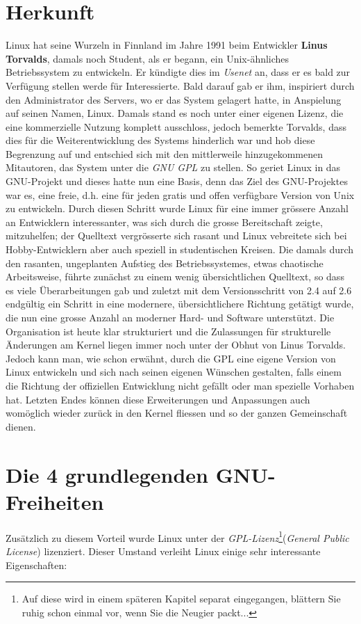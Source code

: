 \documentclass[b5paper,10pt,dvips,fleqn,titlepage,twoside]{book}
\begin{document}
\section{Herkunft}
Linux hat seine Wurzeln in Finnland im Jahre 1991 beim Entwickler \textbf{Linus Torvalds}, damals noch Student, als er begann, ein Unix-ähnliches Betriebssystem zu entwickeln. Er kündigte dies im \emph{Usenet} an, dass er es bald zur Verfügung stellen werde für Interessierte. Bald darauf gab er ihm, inspiriert durch den Administrator des Servers, wo er das System gelagert hatte, in Anspielung auf seinen Namen, Linux.
Damals stand es noch unter einer eigenen Lizenz, die eine kommerzielle Nutzung komplett ausschloss, jedoch bemerkte Torvalds, dass dies für die Weiterentwicklung des Systems hinderlich war und hob diese Begrenzung auf und entschied sich mit den mittlerweile hinzugekommenen Mitautoren, das System unter die \emph{GNU GPL} zu stellen. So geriet Linux in das GNU-Projekt und dieses hatte nun eine Basis, denn das Ziel des GNU-Projektes war es, eine freie, d.h. eine für jeden gratis und offen verfügbare Version von Unix zu entwickeln. Durch diesen Schritt wurde Linux für eine immer grössere Anzahl an Entwicklern interessanter, was sich durch die grosse Bereitschaft zeigte, mitzuhelfen; der Quelltext vergrösserte sich rasant und Linux vebreitete sich bei Hobby-Entwicklern aber auch speziell in studentischen Kreisen.
\newline
Die damals durch den rasanten, ungeplanten Aufstieg des Betriebssystemes, etwas chaotische Arbeitsweise, führte zunächst zu einem wenig übersichtlichen Quelltext, so dass es viele Überarbeitungen gab und zuletzt mit dem Versionsschritt von 2.4 auf 2.6 endgültig ein Schritt in eine modernere, übersichtlichere Richtung getätigt wurde, die nun eine grosse Anzahl an moderner Hard- und Software unterstützt. Die Organisation ist heute klar strukturiert und die Zulassungen für strukturelle Änderungen am Kernel liegen immer noch unter der Obhut von Linus Torvalds.\\
\newline
Jedoch kann man, wie schon erwähnt, durch die GPL eine eigene Version von Linux entwickeln und sich nach seinen eigenen Wünschen gestalten, falls einem die Richtung der offiziellen Entwicklung nicht gefällt oder man spezielle Vorhaben hat. Letzten Endes können diese Erweiterungen und Anpassungen auch womöglich wieder zurück in den Kernel fliessen und so der ganzen Gemeinschaft dienen.
\section{Die 4 grundlegenden GNU-Freiheiten}
 Zusätzlich zu diesem Vorteil wurde Linux unter der \emph{GPL-Lizenz}\footnote{Auf diese wird in einem späteren Kapitel separat eingegangen, blättern Sie ruhig schon einmal vor, wenn Sie die Neugier packt...}(\textit{General Public License}) lizenziert. Dieser Umstand verleiht Linux einige sehr interessante Eigenschaften:\newpage
\end{document}
